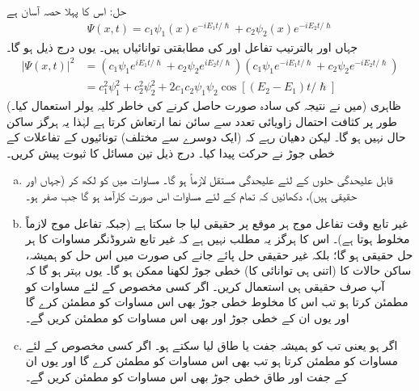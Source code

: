 حل:\quad
اس کا پہلا حصہ آسان ہے
\begin{align*}
\Psi (x,t) = c_{1} \psi_{1}(x)e^{-iE_{1}t/\hslash} + c_{2} \psi_{2}(x)e^{-iE_{2}t/\hslash}
\end{align*}
جہاں   اور   بالترتیب تفاعل   اور   کی مطابقتی توانائیاں ہیں۔ یوں درج ذیل ہو گا۔ 
\begin{align*}
\left| \Psi (x,t) \right|^{2} &= \left( c_{1} \psi_{1} e^{iE_{1}t/\hslash} + c_{2} \psi_{2} e^{iE_{2}t/\hslash} \right) \left( c_{1} \psi_{1} e^{-iE_{1}t/\hslash} + c_{2} \psi_{2} e^{-iE_{2}t/\hslash} \right) \\
&= c_{1}^{2} \psi_{1}^{2} + c_{2}^{2} \psi_{2}^{2} + 2c_{1}c_{2}\psi_{1}\psi_{2} \cos [ ( E_{2} - E_{1})t/\hslash]
\end{align*}
(میں نے نتیجہ کی سادہ صورت حاصل کرنے کی خاطر کلیہ یولر  استعمال کیا۔)  ظاہری طور پر  کثافت احتمال زاویائی تعدد  سے سائن نما ارتعاش کرتا ہے لہٰذا یہ ہرگز ساکن حال نہیں ہو گا۔ لیکن دھیان رہے کہ (ایک دوسرے سے مختلف) تونائیوں کے تفاعلات کے خطی جوڑ نے حرکت پیدا کیا۔ 
درج ذیل تین مسائل کا ثبوت پیش کریں۔
\begin{enumerate}[a.]
\item
قابل علیحدگی حلوں کے لئے علیحدگی مستقل  لازماً  ہو گا۔  مساوات  میں  کو  لکھ کر (جہاں  اور  حقیقی ہیں)،  دکھائیں کہ تمام  کے لئے مساوات  اس صورت کارآمد ہو گا جب  صفر ہو۔ 
\item
غیر تابع وقت تفاعل موج   ہر موقع پر حقیقی لیا جا سکتا ہے (جبکہ تفاعل موج  لازماً مخلوط ہوتا ہے)۔ اس کا  ہرگز یہ مطلب نہیں ہے کہ غیر تابع شروڈنگر مساوات کا ہر حل حقیقی ہو گا؛ بلکہ غیر حقیقی حل پائے جانے کی صورت میں اس حل کو ہمیشہ،  ساکن حالات کا (اتنی ہی توانائی کا) خطی جوڑ لکھنا ممکن ہو گا۔  یوں بہتر ہو گا کہ آپ صرف حقیقی  ہی استعمال کریں۔  اگر کسی مخصوص  کے لئے   مساوات  کو مطمئن کرتا ہو تب اس کا مخلوط خطی جوڑ  بھی اس مساوات کو مطمئن کرے گا اور یوں ان کے خطی جوڑ  اور  بھی اس مساوات کو مطمئن کریں گے۔
\item
اگر   ہو یعنی  تب  کو ہمیشہ جفت یا طاق لیا سکتے ہو۔  اگر کسی مخصوص  کے لئے   مساوات  کو مطمئن کرتا ہو تب   بھی اس مساوات کو مطمئن کرے گا اور یوں ان کے جفت اور طاق خطی جوڑ   بھی اس مساوات کو مطمئن کریں گے۔ 
\end{enumerate}
